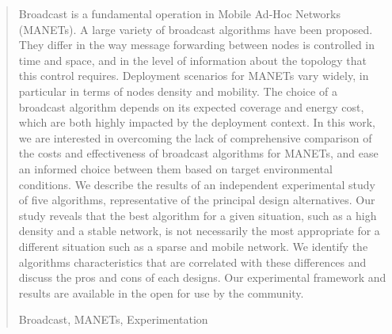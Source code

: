
\begin{abstract}

Broadcast is a fundamental operation in Mobile Ad-Hoc Networks (MANETs).
A large variety of broadcast algorithms have been proposed. 
They differ in the way message forwarding between nodes is controlled in time and space, and in the level of information about the topology that this control requires.
%
Deployment scenarios for MANETs vary widely, in particular in terms of nodes density and mobility.
%
The choice of a broadcast algorithm depends on its expected coverage and energy cost, which are both highly impacted by the deployment context.
%
In this work, we are interested in overcoming the lack of comprehensive comparison of the costs and effectiveness of broadcast algorithms for MANETs, and ease an informed choice between them based on target environmental conditions.
%
We describe the results of an independent experimental study of five algorithms, representative of the principal design alternatives.
%
Our study reveals that the best algorithm for a given situation, such as a high density and a stable network, is not necessarily the most appropriate for a different situation such as a sparse and mobile network.
We identify the algorithms characteristics that are correlated with these differences and discuss the pros and cons of each designs.
%
Our experimental framework and results are available in the open for use by the community.


\begin{IEEEkeywords}
Broadcast, MANETs, Experimentation
\end{IEEEkeywords}

\end{abstract}


